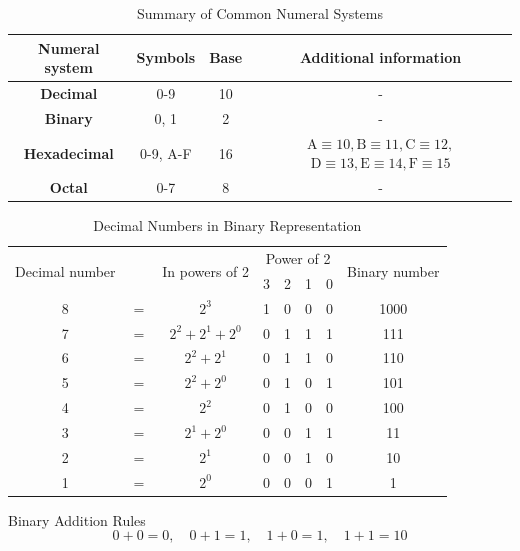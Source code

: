 
\begin{table}[ht]
\centering
\renewcommand{\arraystretch}{1.4}
\begin{tabular}{|c|c|c|c|}
\hline
\textbf{Numeral system} & \textbf{Symbols} & \textbf{Base} & \textbf{Additional information} \\ \hline
\textbf{Decimal} & 0-9 & 10 & - \\ \hline
\textbf{Binary} & 0, 1 & 2 & - \\ \hline
\textbf{Hexadecimal} & 0-9, A-F & 16 & $\mathrm{A} \equiv 10, \mathrm{B} \equiv 11, \mathrm{C} \equiv 12,$ $\mathrm{D} \equiv 13, \mathrm{E} \equiv 14, \mathrm{F} \equiv 15$ \\ \hline
\textbf{Octal} & 0-7 & 8 & - \\ \hline
\end{tabular}
\caption{Summary of Common Numeral Systems}
\label{tab:number_systems}
\end{table}

\begin{table}[!ht]
\centering
\renewcommand{\arraystretch}{1.4}
\begin{tabular}{|c c c c c c c c|}
\hline 
\multirow{2}{*}{Decimal number} & & \multirow{2}{*}{In powers of 2} & \multicolumn{4}{c}{Power of 2} & \multirow{2}{*}{Binary number} \\
& & & 3 & 2 & 1 & 0 & \\ \hline
8 & $=$ & $2^3$ & 1 & 0 & 0 & 0 & 1000 \\
7 & $=$ & $2^2 + 2^1 + 2^0$ & 0 & 1 & 1 & 1 & 111 \\
6 & $=$ & $2^2 + 2^1$ & 0 & 1 & 1 & 0 & 110 \\
5 & $=$ & $2^2 + 2^0$ & 0 & 1 & 0 & 1 & 101 \\
4 & $=$ & $2^2$ & 0 & 1 & 0 & 0 & 100 \\
3 & $=$ & $2^1 + 2^0$ & 0 & 0 & 1 & 1 & 11 \\
2 & $=$ & $2^1$ & 0 & 0 & 1 & 0 & 10 \\
1 & $=$ & $2^0$ & 0 & 0 & 0 & 1 & 1 \\ \hline
\end{tabular}
\caption{Decimal Numbers in Binary Representation}
\end{table}

\begin{proposition}{Binary Addition Rules}
\[
0 + 0 = 0, \quad 0 + 1 = 1, \quad 1 + 0 = 1, \quad 1 + 1 = 10
\]
\end{proposition}

